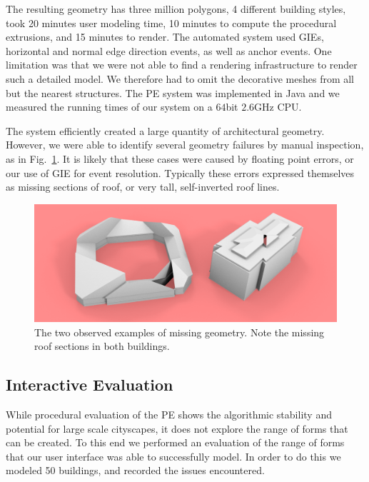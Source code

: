 The resulting geometry has three million polygons, 4 different building styles, took 20 minutes user modeling time, 10 minutes to compute the procedural extrusions, and 15 minutes to render. The automated system used GIEs, horizontal and normal edge direction events, as well as anchor events. One limitation was that we were not able to find a rendering infrastructure to render such a detailed model. We therefore had to omit the decorative meshes from all but the nearest structures. The PE system was implemented in Java and we measured the running times of our system on a $64$bit $2.6$GHz CPU.

The system efficiently created a large quantity of architectural geometry. However, we were able to identify several geometry failures by manual inspection, as in Fig.~\ref{fig:failure_mode}. It is likely that these cases were caused by floating point errors, or our use of GIE for event resolution. Typically these errors expressed themselves as missing sections of roof, or very tall, self-inverted roof lines.

\begin{figure}
  \centering
  \includegraphics[width=1.0\columnwidth]{failure_mode.png}
  \caption[Failure modes in the automated case]{\label{fig:failure_mode}The two observed examples of missing geometry. Note the missing roof sections in both buildings.}
\end{figure}

\FloatBarrier
\subsection{Interactive Evaluation}
\label{Sec:Results}

While procedural evaluation of the PE shows the algorithmic stability and potential for large scale cityscapes, it does not explore the range of forms that can be created. To this end we performed an evaluation of the range of forms that our user interface was able to successfully model. In order to do this we modeled 50 buildings, and recorded the issues encountered. 

